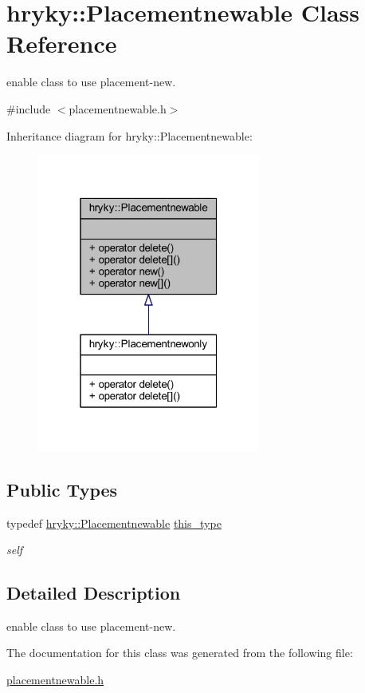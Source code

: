 \hypertarget{classhryky_1_1_placementnewable}{\section{hryky\-:\-:Placementnewable Class Reference}
\label{classhryky_1_1_placementnewable}
}


enable class to use placement-\/new.  




{\ttfamily \#include $<$placementnewable.\-h$>$}



Inheritance diagram for hryky\-:\-:Placementnewable\-:\nopagebreak
\begin{figure}[H]
\begin{center}
\leavevmode
\includegraphics[width=208pt]{classhryky_1_1_placementnewable__inherit__graph}
\end{center}
\end{figure}
\subsection*{Public Types}
\begin{DoxyCompactItemize}
\item 
\hypertarget{classhryky_1_1_placementnewable_a3ace62969c7f685d944479a32ba7c6aa}{typedef \hyperlink{classhryky_1_1_placementnewable}{hryky\-::\-Placementnewable} \hyperlink{classhryky_1_1_placementnewable_a3ace62969c7f685d944479a32ba7c6aa}{this\-\_\-type}}\label{classhryky_1_1_placementnewable_a3ace62969c7f685d944479a32ba7c6aa}

\begin{DoxyCompactList}\small\item\em self \end{DoxyCompactList}\end{DoxyCompactItemize}


\subsection{Detailed Description}
enable class to use placement-\/new. 

The documentation for this class was generated from the following file\-:\begin{DoxyCompactItemize}
\item 
\hyperlink{placementnewable_8h}{placementnewable.\-h}\end{DoxyCompactItemize}
